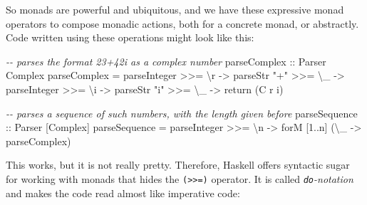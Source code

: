 \documentclass[11pt,
  american,
  DIV13]{article}
\newenvironment{Shaded}{}{}
\newcommand{\CommentTok}[1]{\textcolor[rgb]{0.38,0.63,0.69}{\textit{#1}}}
\newcommand{\DataTypeTok}[1]{\textcolor[rgb]{0.56,0.13,0.00}{#1}}
\newcommand{\DecValTok}[1]{\textcolor[rgb]{0.25,0.63,0.44}{#1}}
\newcommand{\FunctionTok}[1]{\textcolor[rgb]{0.02,0.16,0.49}{#1}}
\newcommand{\NormalTok}[1]{#1}
\newcommand{\OperatorTok}[1]{\textcolor[rgb]{0.40,0.40,0.40}{#1}}
\newcommand{\OtherTok}[1]{\textcolor[rgb]{0.00,0.44,0.13}{#1}}
\newcommand{\StringTok}[1]{\textcolor[rgb]{0.25,0.44,0.63}{#1}}
\begin{document}
So monads are powerful and ubiquitous, and we have these expressive
monad operators to compose monadic actions, both for a concrete monad,
or abstractly. Code written using these operations might look like this:

\begin{Shaded}
\begin{Highlighting}[]
\CommentTok{{-}{-} parses the format \textasciigrave{}23+42i\textasciigrave{} as a complex number}
\OtherTok{parseComplex ::} \DataTypeTok{Parser} \DataTypeTok{Complex}
\NormalTok{parseComplex }\OtherTok{=}
\NormalTok{  parseInteger }\OperatorTok{\textgreater{}\textgreater{}=}\NormalTok{ \textbackslash{}r }\OtherTok{{-}\textgreater{}}
\NormalTok{  parseStr }\StringTok{"+"} \OperatorTok{\textgreater{}\textgreater{}=}\NormalTok{ \textbackslash{}\_ }\OtherTok{{-}\textgreater{}}
\NormalTok{  parseInteger }\OperatorTok{\textgreater{}\textgreater{}=}\NormalTok{ \textbackslash{}i }\OtherTok{{-}\textgreater{}}
\NormalTok{  parseStr }\StringTok{"i"} \OperatorTok{\textgreater{}\textgreater{}=}\NormalTok{ \textbackslash{}\_ }\OtherTok{{-}\textgreater{}}
  \FunctionTok{return}\NormalTok{ (}\DataTypeTok{C}\NormalTok{ r i)}

\CommentTok{{-}{-} parses a sequence of such numbers, with the length given before}
\OtherTok{parseSequence ::} \DataTypeTok{Parser}\NormalTok{ [}\DataTypeTok{Complex}\NormalTok{]}
\NormalTok{parseSequence }\OtherTok{=}
\NormalTok{  parseInteger }\OperatorTok{\textgreater{}\textgreater{}=}\NormalTok{ \textbackslash{}n }\OtherTok{{-}\textgreater{}}
\NormalTok{  forM [}\DecValTok{1}\OperatorTok{..}\NormalTok{n] (\textbackslash{}\_ }\OtherTok{{-}\textgreater{}}\NormalTok{ parseComplex)}
\end{Highlighting}
\end{Shaded}

This works, but it is not really pretty. Therefore, Haskell offers
syntactic sugar for working with monads that hides the
\texttt{(\textgreater{}\textgreater{}=)} operator. It is called
\emph{\texttt{do}-notation} and makes the code read almost like
imperative code:
\end{document}
